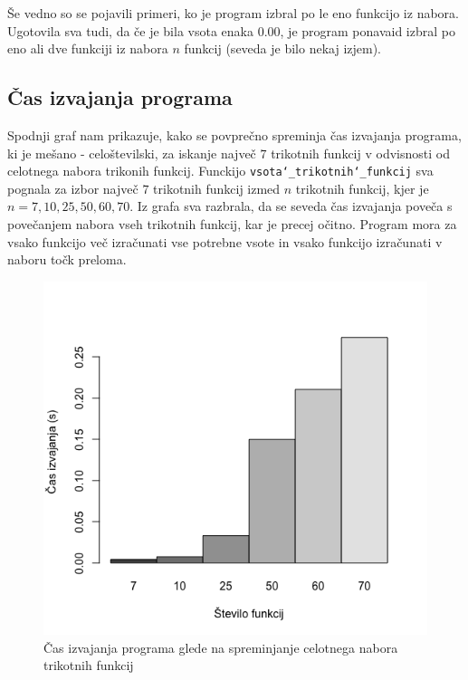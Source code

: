 \documentclass[11pt]{article}
\theoremstyle{definition}
\newcommand{\1}{\mathbbm{1}}
\begin{document}
\newpage
Še vedno so se pojavili primeri, ko je program izbral po le eno funkcijo iz nabora. 
Ugotovila sva tudi, da če je bila vsota enaka $0.00$, je program ponavaid izbral po eno ali dve funkciji iz nabora $n$ funkcij (seveda je bilo nekaj izjem).\\

\subsection{Čas izvajanja programa}
\vspace{0.5cm}

Spodnji graf nam prikazuje, kako se povprečno spreminja čas izvajanja programa, ki je mešano - celoštevilski, za iskanje največ $7$ trikotnih funkcij v odvisnosti od celotnega nabora trikonih funkcij. 
Funckijo \texttt{vsota\char`_trikotnih\char`_funkcij} sva pognala za izbor največ $7$ trikotnih funkcij izmed $n$ trikotnih funkcij, kjer je $n = {7, 10, 25, 50, 60, 70}$.
Iz grafa sva razbrala, da se seveda čas izvajanja poveča s povečanjem nabora vseh trikotnih funkcij, kar je precej očitno. Program mora za vsako funkcijo več izračunati vse potrebne vsote in vsako funkcijo izračunati v naboru točk preloma. \\

\begin{figure}[h!]
	\centering
	\includegraphics[scale=0.55]{casi.png}
	\caption{Čas izvajanja programa glede na spreminjanje celotnega nabora trikotnih funkcij}
\end{figure}
\end{document}
